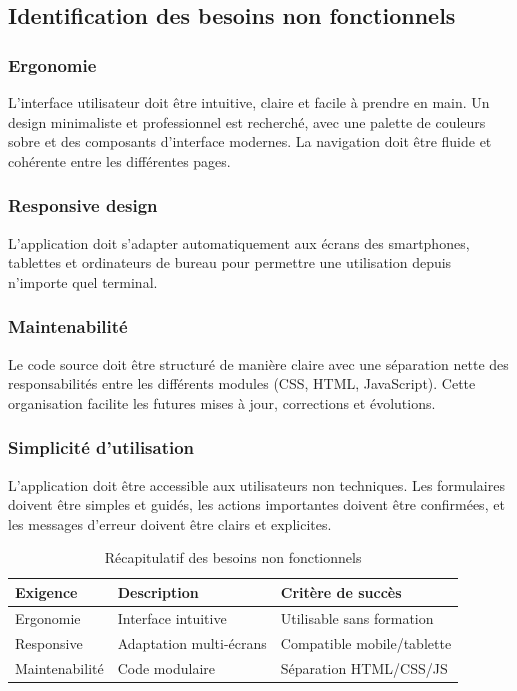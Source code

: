 \documentclass[12pt,a4paper,oneside]{report}
\renewcommand{\arraystretch}{1.3}
\begin{document}
\subsection{Identification des besoins non fonctionnels}

\subsubsection{Ergonomie}

L'interface utilisateur doit être intuitive, claire et facile à prendre en main. Un design minimaliste et professionnel est recherché, avec une palette de couleurs sobre et des composants d'interface modernes. La navigation doit être fluide et cohérente entre les différentes pages.

\subsubsection{Responsive design}

L'application doit s'adapter automatiquement aux écrans des smartphones, tablettes et ordinateurs de bureau pour permettre une utilisation depuis n'importe quel terminal.

\subsubsection{Maintenabilité}

Le code source doit être structuré de manière claire avec une séparation nette des responsabilités entre les différents modules (CSS, HTML, JavaScript). Cette organisation facilite les futures mises à jour, corrections et évolutions.

\subsubsection{Simplicité d'utilisation}

L'application doit être accessible aux utilisateurs non techniques. Les formulaires doivent être simples et guidés, les actions importantes doivent être confirmées, et les messages d'erreur doivent être clairs et explicites.

\begin{table}[htbp]
    \centering
    \caption{Récapitulatif des besoins non fonctionnels}
    \label{tab:besoins-non-fonctionnels}
    \renewcommand{\arraystretch}{1.4}
    \begin{tabular}{p{3.5cm} p{5cm} p{5cm}}
        \toprule
        \textbf{Exigence} & \textbf{Description} & \textbf{Critère de succès} \\
        \midrule
        Ergonomie & Interface intuitive & Utilisable sans formation \\
        Responsive & Adaptation multi-écrans & Compatible mobile/tablette \\
        Maintenabilité & Code modulaire & Séparation HTML/CSS/JS \\
        \bottomrule
    \end{tabular}
\end{table}
\end{document}
